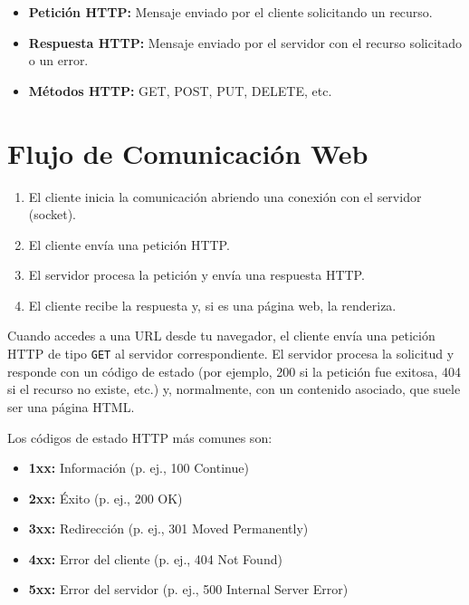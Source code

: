 \documentclass[11pt,a4paper]{article}
\begin{document}
    \begin{VocabBox}
        \begin{itemize}
            \item \textbf{Petición HTTP:} Mensaje enviado por el cliente solicitando un recurso.
            \item \textbf{Respuesta HTTP:} Mensaje enviado por el servidor con el recurso solicitado o un error.
            \item \textbf{Métodos HTTP:} GET, POST, PUT, DELETE, etc.
        \end{itemize}
    \end{VocabBox}

    \section{Flujo de Comunicación Web}
    \begin{enumerate}
        \item El cliente inicia la comunicación abriendo una conexión con el servidor (socket).
        \item El cliente envía una petición HTTP.
        \item El servidor procesa la petición y envía una respuesta HTTP.
        \item El cliente recibe la respuesta y, si es una página web, la renderiza.
    \end{enumerate}

    Cuando accedes a una URL desde tu navegador, el cliente envía una petición HTTP de tipo \texttt{GET} al servidor correspondiente. El servidor procesa la solicitud y responde con un código de estado (por ejemplo, 200 si la petición fue exitosa, 404 si el recurso no existe, etc.) y, normalmente, con un contenido asociado, que suele ser una página HTML.

    \medskip
    Los códigos de estado HTTP más comunes son:
    \begin{itemize}
        \item \textbf{1xx:} Información (p. ej., 100 Continue)
        \item \textbf{2xx:} Éxito (p. ej., 200 OK)
        \item \textbf{3xx:} Redirección (p. ej., 301 Moved Permanently)
        \item \textbf{4xx:} Error del cliente (p. ej., 404 Not Found)
        \item \textbf{5xx:} Error del servidor (p. ej., 500 Internal Server Error)
    \end{itemize}
\end{document}
